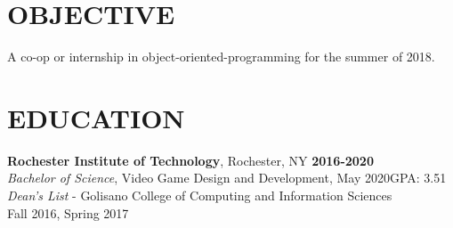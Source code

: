 \documentclass[line,margin]{res}
\begin{document}

\noindent
\makebox[0pt][l]{}%
\makebox[\textwidth][c]{}%
\makebox[0pt][l]{}%
\makebox[\textwidth][c]{}%
\makebox[0pt][l]{}%
\makebox[\textwidth][c]{}%



\begin{resume}

\section{OBJECTIVE}
A co-op or internship in object-oriented-programming for the summer of 2018.



\section{EDUCATION}
\textbf{Rochester Institute of Technology}, Rochester, NY\hfill
    \textbf{2016-2020}\\
{\sl Bachelor of Science}, Video Game Design and Development, May 2020\hfill GPA: 3.51
\\
{\sl Dean's List} - Golisano College of Computing and Information Sciences\hfill \\ Fall 2016, Spring 2017

\end{resume}
\end{document}
